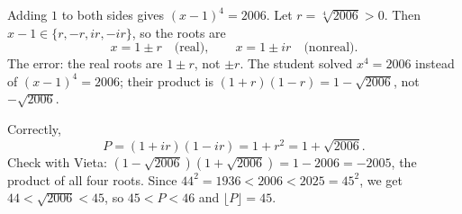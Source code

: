Adding $1$ to both sides gives $(x-1)^4=2006$. Let $r=\sqrt[4]{2006}>0$. Then $x-1\in\{r,-r,ir,-ir\}$, so the roots are
\[
x=1\pm r\quad\text{(real)},\qquad x=1\pm ir\quad\text{(nonreal)}.
\]
The error: the real roots are $1\pm r$, not $\pm r$. The student solved $x^4=2006$ instead of $(x-1)^4=2006$; their product is $(1+r)(1-r)=1-\sqrt{2006}$, not $-\sqrt{2006}$.

Correctly,
\[
P=(1+ir)(1-ir)=1+r^2=1+\sqrt{2006}.
\]
Check with Vieta: $(1-\sqrt{2006})(1+\sqrt{2006})=1-2006=-2005$, the product of all four roots. Since $44^2=1936<2006<2025=45^2$, we get $44<\sqrt{2006}<45$, so $45<P<46$ and $\lfloor P\rfloor=\boxed{45}$.
